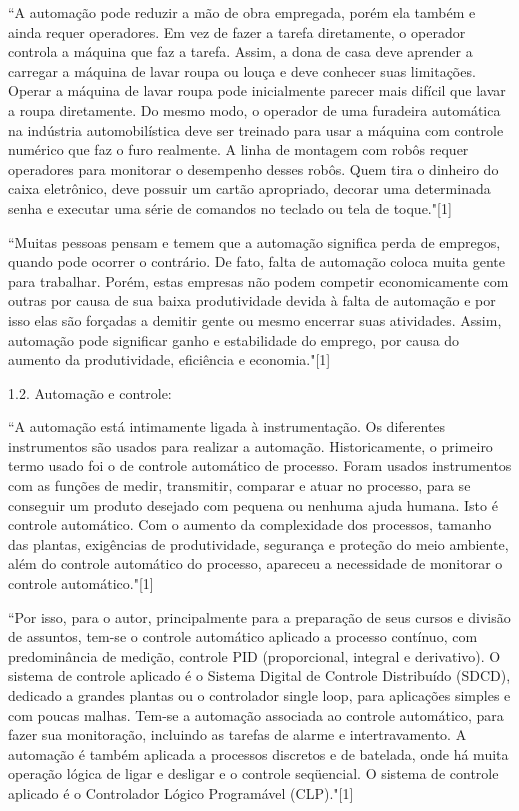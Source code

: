 \documentclass[a4paper, 12pt]{article}
\begin{document}
``A automação pode reduzir a mão de obra empregada, porém ela também e
ainda requer operadores. Em vez de fazer a tarefa diretamente, o operador
controla a máquina que faz a tarefa. Assim, a dona de casa deve aprender a
carregar a máquina de lavar roupa ou louça e deve conhecer suas limitações.
Operar a máquina de lavar roupa pode inicialmente parecer mais difícil que
lavar a roupa diretamente. Do mesmo modo, o operador de uma furadeira 
automática na indústria automobilística deve ser treinado para usar
a máquina com controle numérico que faz o furo realmente. A linha de 
montagem com robôs requer operadores para monitorar o desempenho desses robôs.
Quem tira o dinheiro do caixa eletrônico, deve possuir um cartão apropriado,
decorar uma determinada senha e executar uma série de comandos no teclado 
ou tela de toque."[1]

``Muitas pessoas pensam e temem que a automação significa perda de empregos,
quando pode ocorrer o contrário. De fato, falta de automação coloca muita gente
para trabalhar. Porém, estas empresas não podem competir economicamente com
outras por causa de sua baixa produtividade devida à falta de automação
e por isso elas são forçadas a demitir gente ou mesmo encerrar suas atividades.
Assim, automação pode significar ganho e estabilidade do emprego, por causa do
aumento da produtividade, eficiência e economia."[1]

1.2. Automação e controle:

``A automação está intimamente ligada à instrumentação. Os diferentes
instrumentos são usados para realizar a automação.
Historicamente, o primeiro termo usado foi o de controle automático de processo.
Foram usados instrumentos com as funções de medir, transmitir, comparar e
atuar no processo, para se conseguir um produto desejado com pequena ou
nenhuma ajuda humana. Isto é controle automático.
Com o aumento da complexidade dos processos, tamanho das plantas, exigências de
produtividade, segurança e proteção do meio ambiente, além do controle automático
do processo, apareceu a necessidade de monitorar o controle automático."[1]

``Por isso, para o autor, principalmente para a preparação de seus cursos e
divisão de assuntos, tem-se o controle automático aplicado a processo contínuo,
com predominância de medição, controle PID (proporcional, integral e derivativo).
O sistema de controle aplicado é o Sistema Digital de Controle Distribuído (SDCD),
dedicado a grandes plantas ou o controlador single loop, para aplicações
simples e com poucas malhas. Tem-se a automação associada ao controle automático,
para fazer sua monitoração, incluindo as tarefas de alarme e intertravamento.
A automação é também aplicada a processos discretos e de batelada, onde há muita
operação lógica de ligar e desligar e o controle seqüencial.
O sistema de controle aplicado é o Controlador Lógico Programável (CLP)."[1]
\end{document}
